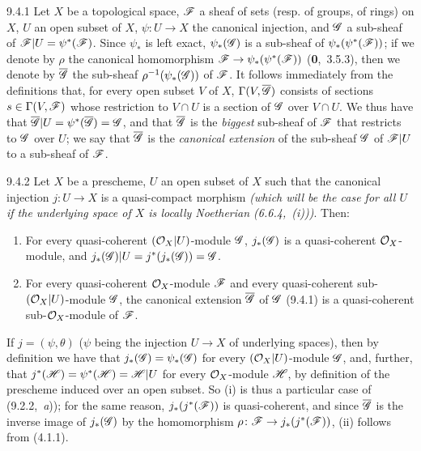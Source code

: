 \documentclass[../main.tex]{subfiles}
\begin{document}
\begin{cx}{9.4.1}
    Let $X$ be a topological space, $\mathscr{F}$ a sheaf of sets (resp. of groups, of rings) on $X$, $U$ an open subset of $X$, $\psi\colon U\to X$ the canonical injection, and $\mathscr{G}$ a sub-sheaf of $\mathscr{F}|U=\psi^*(\mathscr{F})$.
    Since $\psi_*$ is left exact, $\psi_*(\mathscr{G})$ is a sub-sheaf of $\psi_*(\psi^*(\mathscr{F}))$; if we denote by $\rho$ the canonical homomorphism $\mathscr{F}\to\psi_*(\psi^*(\mathscr{F}))$ (\textbf{0},~3.5.3), then we denote by $\overline{\mathscr{G}}$ the sub-sheaf $\rho^{-1}(\psi_*(\mathscr{G}))$ of $\mathscr{F}$.
    It follows immediately from the definitions that, for every open subset $V$ of $X$, $\Gamma(V,\overline{\mathscr{G}})$ consists of sections $s\in\Gamma(V,\mathscr{F})$ whose restriction to $V\cap U$ is a section of $\mathscr{G}$ over $V\cap U$.
    We thus have that $\overline{\mathscr{G}}|U=\psi^*(\overline{\mathscr{G}})=\mathscr{G}$, and that $\overline{\mathscr{G}}$ is the \emph{biggest} sub-sheaf of $\mathscr{F}$ that restricts to $\mathscr{G}$ over $U$; we say that $\overline{\mathscr{G}}$ is the \emph{canonical extension} of the sub-sheaf $\mathscr{G}$ of $\mathscr{F}|U$ to a sub-sheaf of $\mathscr{F}$.
\end{cx}

\begin{cx}[Proposition]{9.4.2}
    Let $X$ be a prescheme, $U$ an open subset of $X$ such that the canonical injection $j\colon U\to X$ is a quasi-compact morphism \emph{(which will be the case for \emph{all} $U$ if the underlying space of $X$ is \emph{locally Noetherian} {\normalfont(6.6.4,~(i))})}.
    Then:
    \begin{enumerate}[label=\normalfont(\roman*)]
        \item For every quasi-coherent $(\mathcal{O}_X|U)$-module $\mathscr{G}$, $j_*(\mathscr{G})$ is a quasi-coherent $\mathcal{O}_X$-module, and $j_*(\mathscr{G})|U=j^*(j_*(\mathscr{G}))=\mathscr{G}$.
        \item For every quasi-coherent $\mathcal{O}_X$-module $\mathscr{F}$ and every quasi-coherent sub-$(\mathcal{O}_X|U)$-module $\mathscr{G}$, the canonical extension $\overline{\mathscr{G}}$ of $\mathscr{G}$ {\normalfont(9.4.1)} is a quasi-coherent sub-$\mathcal{O}_X$-module of $\mathscr{F}$.
    \end{enumerate}
\end{cx}

If $j=(\psi,\theta)$ ($\psi$ being the injection $U\to X$ of underlying spaces), then by definition we have that $j_*(\mathscr{G})=\psi_*(\mathscr{G})$ for every $(\mathcal{O}_X|U)$-module $\mathscr{G}$, and, further, that $j^*(\mathscr{H})=\psi^*(\mathscr{H})=\mathscr{H}|U$ for every $\mathcal{O}_X$-module $\mathscr{H}$, by definition of the prescheme induced over an open subset.
So (i) is thus a particular case of (9.2.2,~\emph{a})); for the same reason, $j_*(j^*(\mathscr{F}))$ is quasi-coherent, and since $\overline{\mathscr{G}}$ is the inverse image of $j_*(\mathscr{G})$ by the homomorphism $\rho\colon\mathscr{F}\to j_*(j^*(\mathscr{F}))$, (ii) follows from (4.1.1).
\end{document}
